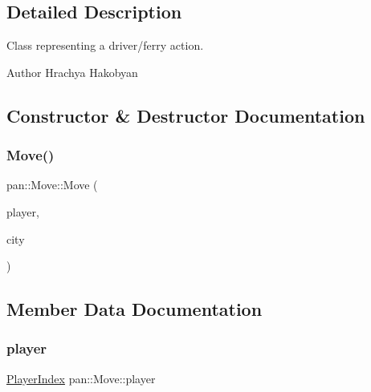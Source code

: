 \subsection{Detailed Description}
Class representing a driver/ferry action. 

\begin{DoxyAuthor}{Author}
Hrachya Hakobyan 
\end{DoxyAuthor}


\subsection{Constructor \& Destructor Documentation}
\mbox{\label{classpan_1_1_move_a4e08c8a5412da98cef5e70b5e30d8cc5}} 
\subsubsection{\texorpdfstring{Move()}{Move()}}
{\footnotesize\ttfamily pan\+::\+Move\+::\+Move (\begin{DoxyParamCaption}\item[{\hyperlink{namespacepan_a0cdabf874fbf1bb3a1f0152d108c2909}{Player\+Index}}]{player,  }\item[{\hyperlink{namespacepan_afaed28aa6603153dcc062a028602d697}{City\+Index}}]{city }\end{DoxyParamCaption})}



\subsection{Member Data Documentation}
\mbox{\label{classpan_1_1_move_a56c9b18c1a51462ca1bcf777e2f45bbd}} 
\subsubsection{\texorpdfstring{player}{player}}
{\footnotesize\ttfamily \hyperlink{namespacepan_a0cdabf874fbf1bb3a1f0152d108c2909}{Player\+Index} pan\+::\+Move\+::player}

\mbox{\label{classpan_1_1_move_a0f1d183011d04af23637005a99b50d5d}} 
